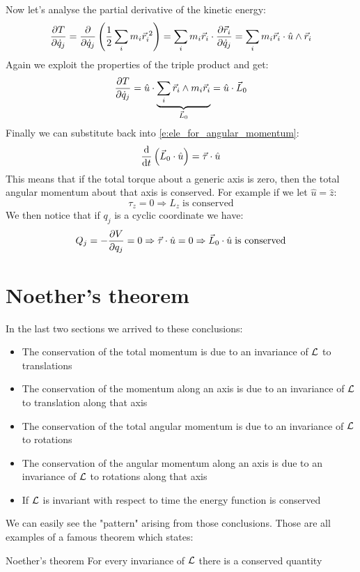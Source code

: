 Now let's analyse the partial derivative of the kinetic energy:
\begin{equation}
    \pdv{T}{\dot{q}_j} = \pdv{}{\dot{q}_j}\brackets{\dfrac{1}{2}\bigsum_i m_i \vec{r}_i^{\;2}} = \bigsum_i m_i \vec{r}_i \cdot \pdv{\vec{r}_i}{\dot{q}_j} = \bigsum_i m_i \vec{r}_i \cdot \hat{u} \wedge \vec{r}_i
\end{equation}
Again we exploit the properties of the triple product and get:
\begin{equation}
    \pdv{T}{\dot{q}_j} =   \hat{u} \cdot \underbrace{\bigsum_i \vec{r}_i \wedge m_i \vec{r}_i}_{\vec{L}_0} = \hat{u} \cdot \vec{L}_0
\end{equation}
Finally we can substitute back into \eqref{e:ele_for_angular_momentum}:
\begin{equation}
    \dv{}{t}\brackets{\vec{L}_0 \cdot \hat{u}} = \vec{\tau} \cdot \hat{u}
\end{equation}
This means that if the total torque about a generic axis is zero, then the total angular momentum about that axis is conserved. For example if we let $\hat{u} = \hat{z}$:
\begin{equation}
    \tau_z = 0 \Rightarrow L_z\;\text{is conserved}
\end{equation}
We then notice that if $q_j$ is a cyclic coordinate we have:
\begin{equation}
    Q_j = -\pdv{V}{q_j} = 0 \Rightarrow \vec{\tau} \cdot \hat{u} = 0 \Rightarrow \vec{L}_0 \cdot \hat{u}\;\text{is conserved}
\end{equation}
\section{Noether's theorem}
In the last two sections we arrived to these conclusions:
\begin{itemize}
    \item The conservation of the total momentum is due to an invariance of $\mathcal{L}$ to translations
    \item The conservation of the momentum along an axis is due to an invariance of $\mathcal{L}$ to translation along that axis
    \item The conservation of the total angular momentum is due to an invariance of $\mathcal{L}$ to rotations
    \item The conservation of the angular momentum along an axis is due to an invariance of $\mathcal{L}$ to rotations along that axis
    \item If $\mathcal{L}$ is invariant with respect to time the energy function is conserved
\end{itemize}
We can easily see the "pattern" arising from those conclusions. Those are all examples of a famous theorem which states:
\begin{theorem}{Noether's theorem}
    For every invariance of $\mathcal{L}$ there is a conserved quantity
\end{theorem}
